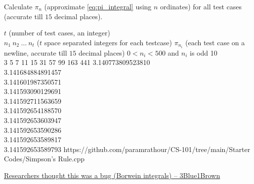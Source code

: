 \documentclass[../../Problems]{subfiles}
\begin{document}
{%
Calculate $\pi_n$ (approximate \ref{eq:pi_integral} using $n$ ordinates) for all test cases (accurate till $15$ decimal places).%
\begin{testcases}
	{$t$ \hfill(number of test cases, an integer)\\$n_1\ n_2\ \ldots\ n_t$ \hfill($t$ space separated integers for each testcase)}
	{$\pi_{n_i}$ \hfill(each test case on a newline, accurate till $15$ decimal places)}
	{$0 < n_i < 500$ and $n_i$ is odd}
	{10\\3 5 7 11 15 31 57 99 163 441}
	{3.140773809523810\\3.141684884891457\\3.141601987350571\\3.141593090129691\\3.141592711563659\\3.141592654188570\\3.141592653603947\\3.141592653590286\\3.141592653589817\\3.141592653589793}
	{https://github.com/paramrathour/CS-101/tree/main/Starter Codes/Simpson's Rule.cpp}
\end{testcases}
\begin{funvideo}
\href{https://youtu.be/851U557j6HE}{Researchers thought this was a bug (Borwein integrals) -- 3Blue1Brown}
\end{funvideo}
}
\end{document}
